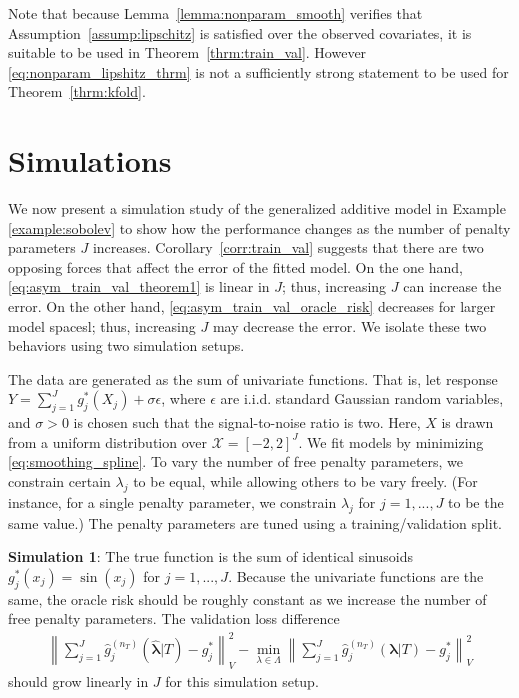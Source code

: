 \documentclass[12pt]{article} %
\theoremstyle{definition}
\begin{document}
Note that because Lemma~\ref{lemma:nonparam_smooth} verifies that Assumption~\ref{assump:lipschitz} is satisfied over the observed covariates, it is suitable to be used in Theorem~\ref{thrm:train_val}.
However \eqref{eq:nonparam_lipshitz_thrm} is not a sufficiently strong statement to be used for Theorem~\ref{thrm:kfold}.

\section{Simulations}\label{sec:simulations}

We now present a simulation study of the generalized additive model in Example \ref{example:sobolev} to show how the performance changes as the number of penalty parameters $J$ increases.
Corollary~\ref{corr:train_val} suggests that there are two opposing forces that affect the error of the fitted model.
On the one hand, \eqref{eq:asym_train_val_theorem1} is linear in $J$; thus, increasing $J$ can increase the error.
On the other hand, \eqref{eq:asym_train_val_oracle_risk} decreases for larger model spacesl; thus, increasing $J$ may decrease the error.
We isolate these two behaviors using two simulation setups.

The data are generated as the sum of univariate functions.
That is, let response
$Y = \sum_{j=1}^J g_j^*(X_j) + \sigma \epsilon$,
where $\epsilon$ are i.i.d. standard Gaussian random variables, and $\sigma > 0$ is chosen such that the signal-to-noise ratio is two.
Here, $X$ is drawn from a uniform distribution over $\mathcal{X} = [-2, 2]^J$.
We fit models by minimizing \eqref{eq:smoothing_spline}.
To vary the number of free penalty parameters, we constrain certain $\lambda_j$ to be equal, while allowing others to be vary freely.
(For instance, for a single penalty parameter, we constrain $\lambda_j$ for $j=1,...,J$ to be the same value.)
The penalty parameters are tuned using a training/validation split.

\noindent \textbf{Simulation 1}: The true function is the sum of identical sinusoids
$g_j^*(x_j) = \sin(x_j)$ for $j = 1,...,J$.
Because the univariate functions are the same, the oracle risk should be roughly constant as we increase the number of free penalty parameters.
The validation loss difference
\begin{align}
\left \| \sum_{j=1}^J \hat{g}^{(n_T)}_j(\hat{\boldsymbol{\lambda}}|T) - g^*_j \right \|_V^2 -
\min_{\lambda \in \Lambda}
\left \| \sum_{j=1}^J \hat{g}^{(n_T)}_j(\boldsymbol{\lambda} | T) - g^*_j \right \|_V^2
\label{eq:excess_risk_sim}
\end{align}
should grow linearly in $J$ for this simulation setup.
\end{document}
